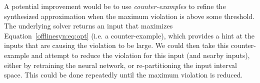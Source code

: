 A potential improvement would be to use \textit{counter-examples} to refine
the synthesized approximation when the maximum violation is above some
threshold. The underlying solver returns an input that maximizes
Equation~\ref{offlinesyn:eq:opt} (i.e. a counter-example), which provides a
hint at the inputs that are causing the violation to be large. We could
then take this counter-example and attempt to reduce the violation for this
input (and nearby inputs), either by retraining the neural network, or
re-partitioning the input interval space. This could be done repeatedly
until the maximum violation is reduced.